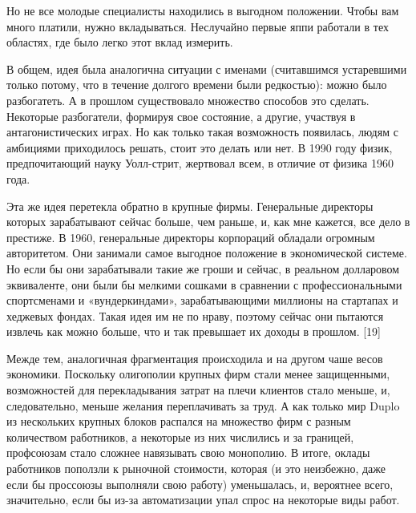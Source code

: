 \documentclass[ebook,12pt,oneside,openany]{memoir}
\begin{document}
Но не все молодые специалисты находились в выгодном положении. Чтобы
вам много платили, нужно вкладываться. Неслучайно первые яппи работали
в тех областях, где было легко этот вклад измерить. \newline

В общем, идея была аналогична ситуации с именами (считавшимся
устаревшими только потому, что в течение долгого времени были
редкостью): можно было разбогатеть. А в прошлом существовало множество
способов это сделать. Некоторые разбогатели, формируя свое состояние,
а другие, участвуя в антагонистических играх. Но как только такая
возможность появилась, людям с амбициями приходилось решать, стоит это
делать или нет. В 1990 году физик, предпочитающий науку Уолл-стрит,
жертвовал всем, в отличие от физика 1960 года. \newline

Эта же идея перетекла обратно в крупные фирмы. Генеральные директоры
которых зарабатывают сейчас больше, чем раньше, и, как мне кажется,
все дело в престиже. В 1960, генеральные директоры корпораций обладали
огромным авторитетом. Они занимали самое выгодное положение в
экономической системе. Но если бы они зарабатывали такие же гроши и
сейчас, в реальном долларовом эквиваленте, они были бы мелкими сошками
в сравнении с профессиональными спортсменами и «вундеркиндами»,
зарабатывающими миллионы на стартапах и хеджевых фондах. Такая идея им
не по нраву, поэтому сейчас они пытаются извлечь как можно больше, что
и так превышает их доходы в прошлом. [19] \newline

Межде тем, аналогичная фрагментация происходила и на другом чаше весов
экономики. Поскольку олигополии крупных фирм стали менее защищенными,
возможностей для перекладывания затрат на плечи клиентов стало меньше,
и, следовательно, меньше желания переплачивать за труд. А как только
мир Duplo из нескольких крупных блоков распался на множество фирм с
разным количеством работников, а некоторые из них числились и за
границей, профсоюзам стало сложнее навязывать свою монополию. В итоге,
оклады работников поползли к рыночной стоимости, которая (и это
неизбежно, даже если бы проссоюзы выполняли свою работу) уменьшалась,
и, вероятнее всего, значительно, если бы из-за автоматизации упал
спрос на некоторые виды работ. \newline
\end{document}
